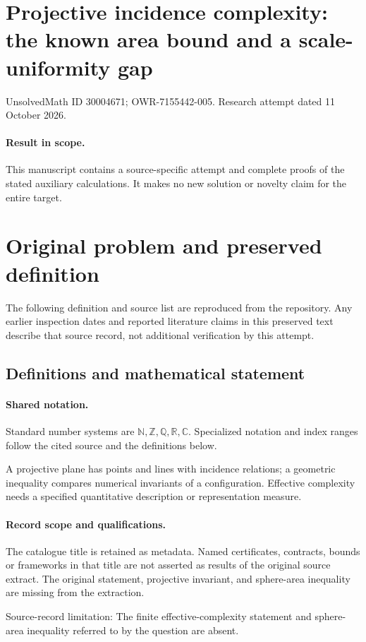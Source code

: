\documentclass[11pt]{article}
\begin{document}
\section*{Projective incidence complexity: the known area bound and a scale-uniformity gap}
\noindent UnsolvedMath ID 30004671; OWR-7155442-005. Research attempt dated 11 October 2026.
\paragraph{Result in scope.}This manuscript contains a source-specific attempt and complete proofs of the stated auxiliary calculations. It makes no new solution or novelty claim for the entire target.
\section{Original problem and preserved definition}
The following definition and source list are reproduced from the repository. Any earlier inspection dates and reported literature claims in this preserved text describe that source record, not additional verification by this attempt.
\subsection{Definitions and mathematical statement}

\paragraph{Shared notation.}Standard number systems are $\mathbb N,\mathbb Z,\mathbb Q,\mathbb R,\mathbb C$. Specialized notation and index ranges follow the cited source and the definitions below.


A projective plane has points and lines with incidence relations; a geometric inequality compares numerical invariants of a configuration. Effective complexity needs a specified quantitative description or representation measure.
\paragraph{Record scope and qualifications.}
The catalogue title is retained as metadata. Named certificates, contracts, bounds or frameworks in that title are not asserted as results of the original source extract.
The original statement, projective invariant, and sphere-area inequality are missing from the extraction.

Source-record limitation: The finite effective-complexity statement and sphere-area inequality referred to by the question are absent.
\end{document}
